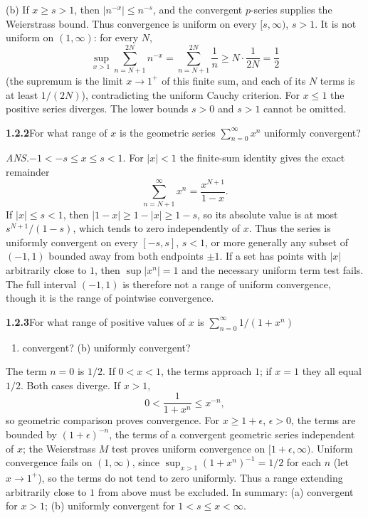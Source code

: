 (b) If $x\ge s>1$, then $|n^{-x}|\le n^{-s}$, and the convergent
$p$-series supplies the Weierstrass bound. Thus convergence is uniform
on every $[s,\infty)$, $s>1$. It is not uniform on $(1,\infty)$:
for every $N$,
\[
 \sup_{x>1}\sum_{n=N+1}^{2N}n^{-x}
 =\sum_{n=N+1}^{2N}\frac1n\ge N\cdot\frac1{2N}=\frac12
\]
(the supremum is the limit $x\to1^+$ of this finite sum, and each of its
$N$ terms is at least $1/(2N)$),
contradicting the uniform Cauchy criterion. For $x\le1$ the positive
series diverges. The lower bounds $s>0$ and $s>1$ cannot be omitted.


\par\bigskip
\noindent\textbf{1.2.2}\quad For what range of $x$ is the geometric series
$\sum_{n=0}^{\infty}x^{n}$ uniformly convergent?
\par\nobreak\hfill\emph{ANS.}\enspace $-1<-s\leq x\leq s<1$.
\solution
For $|x|<1$ the finite-sum identity gives the exact remainder
\[
 \sum_{n=N+1}^\infty x^n=\frac{x^{N+1}}{1-x}.
\]
If $|x|\le s<1$, then $|1-x|\ge1-|x|\ge1-s$, so its absolute value is
at most $s^{N+1}/(1-s)$, which tends to zero independently of $x$. Thus the series is uniformly
convergent on every $[-s,s]$, $s<1$, or more generally any subset of
$(-1,1)$ bounded away from both endpoints $\pm1$. If a set has points with $|x|$
arbitrarily close to $1$, then $\sup|x^n|=1$ and the necessary uniform
term test fails. The full interval $(-1,1)$ is therefore not a range
of uniform convergence, though it is the range of pointwise convergence.


\par\bigskip
\noindent\textbf{1.2.3}\quad For what range of positive values of $x$ is
$\sum_{n=0}^{\infty}1/(1+x^{n})$
\begin{enumerate}
\item[(a)] convergent? (b) uniformly convergent?
\end{enumerate}
\solution
The term $n=0$ is $1/2$. If $0<x<1$, the terms approach $1$; if $x=1$
they all equal $1/2$. Both cases diverge. If $x>1$,
\[
 0<\frac1{1+x^n}\le x^{-n},
\]
so geometric comparison proves convergence. For $x\ge1+\epsilon$,
$\epsilon>0$, the terms are bounded by $(1+\epsilon)^{-n}$, the terms of
a convergent geometric series independent of $x$; the Weierstrass $M$
test proves uniform convergence on $[1+\epsilon,\infty)$. Uniform convergence
fails on $(1,\infty)$, since
$\sup_{x>1}(1+x^n)^{-1}=1/2$ for each $n$ (let $x\to1^+$), so the terms
do not tend to zero uniformly.
Thus a range extending arbitrarily close to $1$ from above must be excluded.
In summary: (a) convergent for $x>1$; (b) uniformly convergent for
$1<s\le x<\infty$.


